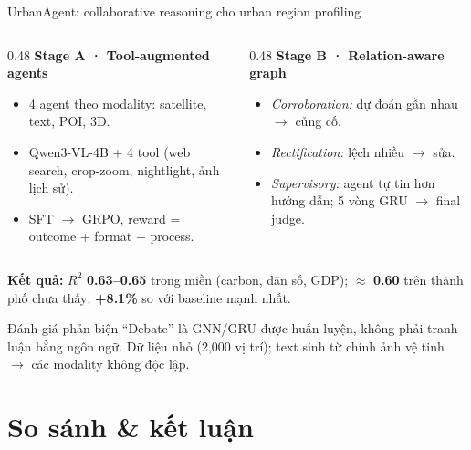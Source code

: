 \documentclass[aspectratio=169,10pt]{beamer}
\begin{document}
\begin{frame}{UrbanAgent: collaborative reasoning cho urban region profiling}
  \begin{columns}[T]
    \begin{column}{0.48\textwidth}
      \textbf{Stage A · Tool-augmented agents}
      \begin{itemize}
        \item 4 agent theo modality: satellite, text, POI, 3D.
        \item Qwen3-VL-4B + 4 tool (web search, crop-zoom, nightlight, ảnh lịch sử).
        \item SFT $\to$ GRPO, reward = outcome + format + process.
      \end{itemize}
    \end{column}
    \begin{column}{0.48\textwidth}
      \textbf{Stage B · Relation-aware graph}
      \begin{itemize}
        \item \emph{Corroboration:} dự đoán gần nhau $\to$ củng cố.
        \item \emph{Rectification:} lệch nhiều $\to$ sửa.
        \item \emph{Supervisory:} agent tự tin hơn hướng dẫn; 5 vòng GRU $\to$ final judge.
      \end{itemize}
    \end{column}
  \end{columns}
  \vspace{4pt}
  \textbf{Kết quả:} $R^2$ \textbf{0.63--0.65} trong miền (carbon, dân số, GDP);
  $\approx$ \textbf{0.60} trên thành phố chưa thấy; \textbf{+8.1\%} so với baseline mạnh nhất.
  \begin{alertblock}{Đánh giá phản biện}
    “Debate” là GNN/GRU được huấn luyện, không phải tranh luận bằng ngôn ngữ.
    Dữ liệu nhỏ (2,000 vị trí); text sinh từ chính ảnh vệ tinh $\to$ các modality không độc lập.
  \end{alertblock}
\end{frame}

\section{So sánh \& kết luận}
\end{document}
